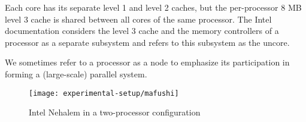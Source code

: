 
Each core has its separate level 1 and level 2 caches, but the
per-processor 8 MB level 3 cache is shared between all cores of the
same processor. The Intel documentation considers the level 3 cache
and the memory controllers of a processor as a separate subsystem and
refers to this subsystem as the uncore. 

We sometimes refer to a processor as a node to emphasize its
participation in forming a (large-scale) parallel system.

\begin{figure}[htb]
  \centering
  \texttt{[image: experimental-setup/mafushi]}
  \caption[Intel Nehalem in a two-processor configuration]{Intel
    Nehalem in a two-processor configuration}
  \label{fig:experimental-setup-mafushi}
\end{figure}


